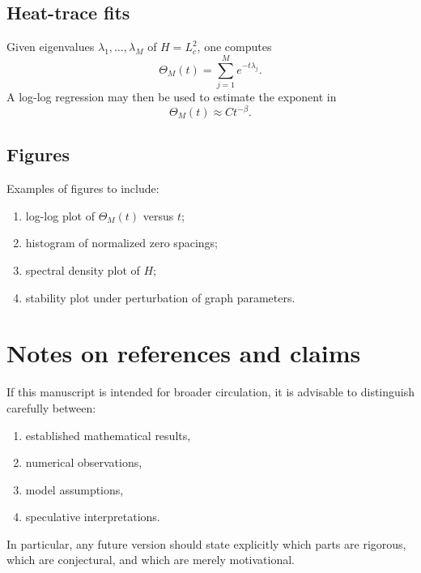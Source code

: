 \documentclass[11pt,a4paper]{amsart}
\theoremstyle{plain}
\theoremstyle{definition}
\theoremstyle{remark}
\newcommand{\ThetaH}{\Theta}
\newcommand{\Lc}{L_c}
\begin{document}
	\subsection{Heat-trace fits}
	
	Given eigenvalues $\lambda_1,\dots,\lambda_M$ of $H=\Lc^2$, one computes
	\[
	\ThetaH_M(t)=\sum_{j=1}^M e^{-t\lambda_j}.
	\]
	A log-log regression may then be used to estimate the exponent in
	\[
	\ThetaH_M(t)\approx C t^{-\beta}.
	\]
	
	\subsection{Figures}
	
	Examples of figures to include:
	\begin{enumerate}[label=\arabic*.]
		\item log-log plot of $\ThetaH_M(t)$ versus $t$;
		\item histogram of normalized zero spacings;
		\item spectral density plot of $H$;
		\item stability plot under perturbation of graph parameters.
	\end{enumerate}
	
	\section{Notes on references and claims}
	
	If this manuscript is intended for broader circulation, it is advisable to distinguish carefully between:
	\begin{enumerate}[label=\arabic*.]
		\item established mathematical results,
		\item numerical observations,
		\item model assumptions,
		\item speculative interpretations.
	\end{enumerate}
	
	In particular, any future version should state explicitly which parts are rigorous, which are conjectural, and which are merely motivational.
	
\end{document}
